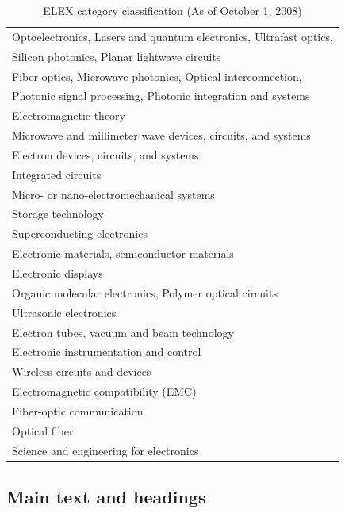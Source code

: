 \documentclass{elex}
\begin{document}
\begin{table}[ht]
\begin{center}
\caption{ELEX category classification (As of October 1, 2008)} \label{tab:classification}
\begin{small}
\begin{tabular}{l}
\hline
Optoelectronics, Lasers and quantum electronics, Ultrafast optics,  \\
Silicon photonics, Planar lightwave circuits \\
\hline
Fiber optics, Microwave photonics, Optical interconnection,  \\
Photonic signal processing, Photonic integration and systems \\
\hline
Electromagnetic theory \\
\hline
Microwave and millimeter wave devices, circuits, and systems \\
\hline
Electron devices, circuits, and systems \\
\hline
Integrated circuits \\
\hline
Micro- or nano-electromechanical systems \\
\hline
Storage technology \\
\hline
Superconducting electronics \\
\hline
Electronic materials, semiconductor materials \\
\hline
Electronic displays \\
\hline
Organic molecular electronics, Polymer optical circuits \\
\hline
Ultrasonic electronics \\
\hline
Electron tubes, vacuum and beam technology \\
\hline
Electronic instrumentation and control \\
\hline
Wireless circuits and devices \\
\hline
Electromagnetic compatibility (EMC) \\
\hline
Fiber-optic communication \\
\hline
Optical fiber \\
\hline
Science and engineering for electronics \\
\hline
\end{tabular}
\end{small}
\end{center}
\end{table}


\subsection{Main text and headings}
\end{document}
